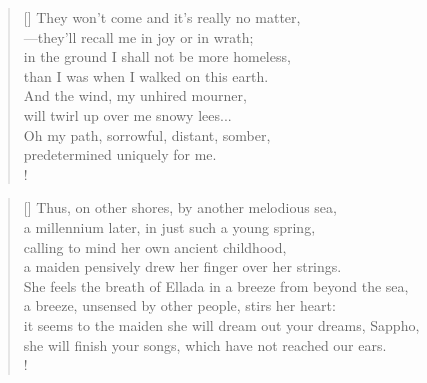 \documentclass[]{article}
\begin{document}
\settowidth{\versewidth}{They won't come and it's really no matter,}
\begin{verse}[\versewidth]
They won't come and it's really no matter,\\
—they'll recall me in joy or in wrath;\\
in the ground I shall not be more homeless,\\
than I was when I walked on this earth.\\
And the wind, my unhired mourner,\\
will twirl up over me snowy lees...\\
Oh my path, sorrowful, distant, somber,\\
predetermined uniquely for me.\\!
\end{verse}

\bigskip \bigskip
{}
\settowidth{\versewidth}{Thus, on other shores, by another melodious sea,   }
\begin{verse}[\versewidth]
Thus, on other shores, by another melodious sea,\\
a millennium later, in just such a young spring,\\
calling to mind her own ancient childhood,\\
a maiden pensively drew her finger over her strings.\\
She feels the breath of Ellada in a breeze from beyond the sea,\\
a breeze, unsensed by other people, stirs her heart:\\
it seems to the maiden she will dream out your dreams, Sappho,\\
she will finish your songs, which have not reached our ears.\\!
\end{verse}
\newpage
\end{document}
